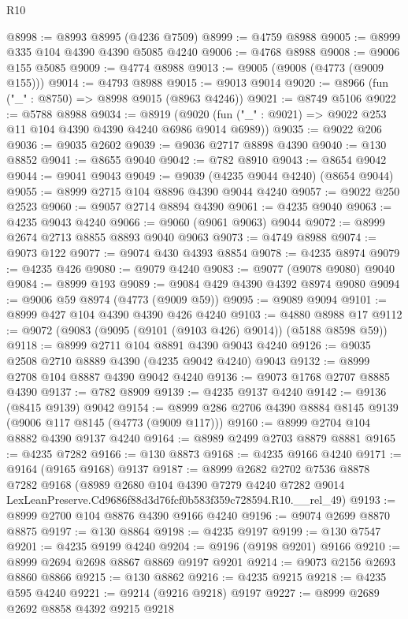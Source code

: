 \begin{lexlean}{R10}
\begin{coremodule}
@8998 := @8993 @8995 (@4236 @7509)
@8999 := @4759 @8988
@9005 := @8999 @335 @104 @4390 @4390 @5085 @4240
@9006 := @4768 @8988
@9008 := @9006 @155 @5085
@9009 := @4774 @8988
@9013 := @9005 (@9008 (@4773 (@9009 @155)))
@9014 := @4793 @8988
@9015 := @9013 @9014
@9020 := @8966 (fun ("_" : @8750) => @8998 @9015 (@8963 @4246))
@9021 := @8749 @5106
@9022 := @5788 @8988
@9034 := @8919
    (@9020 (fun ("_" : @9021) => @9022 @253 @11 @104 @4390 @4390 @4240 @6986 @9014 @6989))
@9035 := @9022 @206
@9036 := @9035 @2602
@9039 := @9036 @2717 @8898 @4390
@9040 := @130 @8852
@9041 := @8655 @9040
@9042 := @782 @8910
@9043 := @8654 @9042
@9044 := @9041 @9043
@9049 := @9039 (@4235 @9044 @4240) (@8654 @9044)
@9055 := @8999 @2715 @104 @8896 @4390 @9044 @4240
@9057 := @9022 @250 @2523
@9060 := @9057 @2714 @8894 @4390
@9061 := @4235 @9040
@9063 := @4235 @9043 @4240
@9066 := @9060 (@9061 @9063) @9044
@9072 := @8999 @2674 @2713 @8855 @8893 @9040 @9063
@9073 := @4749 @8988
@9074 := @9073 @122
@9077 := @9074 @430 @4393 @8854
@9078 := @4235 @8974
@9079 := @4235 @426
@9080 := @9079 @4240
@9083 := @9077 (@9078 @9080) @9040
@9084 := @8999 @193
@9089 := @9084 @429 @4390 @4392 @8974 @9080
@9094 := @9006 @59 @8974 (@4773 (@9009 @59))
@9095 := @9089 @9094
@9101 := @8999 @427 @104 @4390 @4390 @426 @4240
@9103 := @4880 @8988 @17
@9112 := @9072 (@9083 (@9095 (@9101 (@9103 @426) @9014)) (@5188 @8598 @59))
@9118 := @8999 @2711 @104 @8891 @4390 @9043 @4240
@9126 := @9035 @2508 @2710 @8889 @4390 (@4235 @9042 @4240) @9043
@9132 := @8999 @2708 @104 @8887 @4390 @9042 @4240
@9136 := @9073 @1768 @2707 @8885 @4390
@9137 := @782 @8909
@9139 := @4235 @9137 @4240
@9142 := @9136 (@8415 @9139) @9042
@9154 := @8999 @286 @2706 @4390 @8884 @8145 @9139 (@9006 @117 @8145 (@4773 (@9009 @117)))
@9160 := @8999 @2704 @104 @8882 @4390 @9137 @4240
@9164 := @8989 @2499 @2703 @8879 @8881
@9165 := @4235 @7282
@9166 := @130 @8873
@9168 := @4235 @9166 @4240
@9171 := @9164 (@9165 @9168) @9137
@9187 := @8999
    @2682
    @2702
    @7536
    @8878
    @7282
    @9168
    (@8989
      @2680
      @104
      @4390
      @7279
      @4240
      @7282
      @9014
      LexLeanPreserve.Cd9686f88d3d76fcf0b583f359c728594.R10.__rel_49)
@9193 := @8999 @2700 @104 @8876 @4390 @9166 @4240
@9196 := @9074 @2699 @8870 @8875
@9197 := @130 @8864
@9198 := @4235 @9197
@9199 := @130 @7547
@9201 := @4235 @9199 @4240
@9204 := @9196 (@9198 @9201) @9166
@9210 := @8999 @2694 @2698 @8867 @8869 @9197 @9201
@9214 := @9073 @2156 @2693 @8860 @8866
@9215 := @130 @8862
@9216 := @4235 @9215
@9218 := @4235 @595 @4240
@9221 := @9214 (@9216 @9218) @9197
@9227 := @8999 @2689 @2692 @8858 @4392 @9215 @9218

\end{coremodule}
\end{lexlean}
